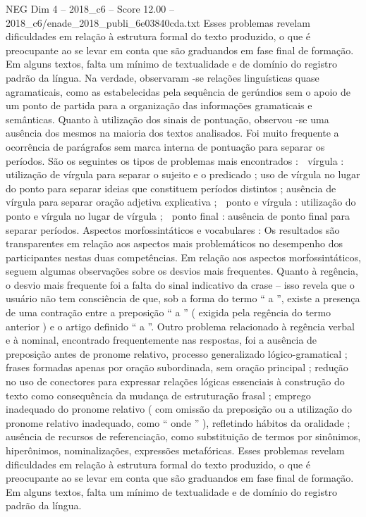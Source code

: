 \begin{textsample}{NEG Dim 4 – 2018\_c6 – Score 12.00 – 2018\_c6/enade\_2018\_publi\_6e03840cda.txt}
Esses problemas revelam dificuldades em relação à estrutura formal do texto produzido, o que é preocupante ao se levar em conta que são graduandos em fase final de formação.
Em alguns textos, falta um mínimo de textualidade e de domínio do registro padrão da língua.
Na verdade, observaram -se relações linguísticas quase agramaticais, como as estabelecidas pela sequência de gerúndios sem o apoio de um ponto de partida para a organização das informações gramaticais e semânticas.
Quanto à utilização dos sinais de pontuação, observou -se uma ausência dos mesmos na maioria dos textos analisados.
Foi muito frequente a ocorrência de parágrafos sem marca interna de pontuação para separar os períodos.
São os seguintes os tipos de problemas mais encontrados :  vírgula : utilização de vírgula para separar o sujeito e o predicado ; uso de vírgula no lugar do ponto para separar ideias que constituem períodos distintos ; ausência de vírgula para separar oração adjetiva explicativa ;  ponto e vírgula : utilização do ponto e vírgula no lugar de vírgula ;  ponto final : ausência de ponto final para separar períodos.
Aspectos morfossintáticos e vocabulares : Os resultados são transparentes em relação aos aspectos mais problemáticos no desempenho dos participantes nestas duas competências.
Em relação aos aspectos morfossintáticos, seguem algumas observações sobre os desvios mais frequentes.
Quanto à regência, o desvio mais frequente foi a falta do sinal indicativo da crase – isso revela que o usuário não tem consciência de que, sob a forma do termo “ a ”, existe a presença de uma contração entre a preposição “ a ” ( exigida pela regência do termo anterior ) e o artigo definido “ a ”.
Outro problema relacionado à regência verbal e à nominal, encontrado frequentemente nas respostas, foi a ausência de preposição antes de pronome relativo, processo generalizado lógico-gramatical ; frases formadas apenas por oração subordinada, sem oração principal ; redução no uso de conectores para expressar relações lógicas essenciais à construção do texto como consequência da mudança de estruturação frasal ; emprego inadequado do pronome relativo ( com omissão da preposição ou a utilização do pronome relativo inadequado, como “ onde ” ), refletindo hábitos da oralidade ; ausência de recursos de referenciação, como substituição de termos por sinônimos, hiperônimos, nominalizações, expressões metafóricas.
Esses problemas revelam dificuldades em relação à estrutura formal do texto produzido, o que é preocupante ao se levar em conta que são graduandos em fase final de formação.
Em alguns textos, falta um mínimo de textualidade e de domínio do registro padrão da língua.

\end{textsample}
